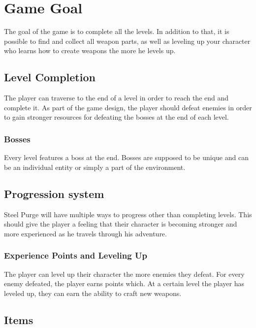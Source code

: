 \documentclass[../Main.tex]{subfiles}
\begin{document}
\section{Game Goal}

The goal of the game is to complete all the levels. In addition to that, it is possible to find and collect all weapon parts, as well as leveling up your character who learns how to create weapons the more he levels up. 

\subsection{Level Completion}

The player can traverse to the end of a level in order to reach the end and complete it. As part of the game design, the player should defeat enemies in order to gain stronger resources for defeating the bosses at the end of each level.

\subsubsection{Bosses}

Every level features a boss at the end. Bosses are supposed to be unique and can be an individual entity or simply a part of the environment.

\subsection{Progression system}

Steel Purge will have multiple ways to progress other than completing levels. This should give the player a feeling that their character is becoming stronger and more experienced as he travels through his adventure.

\subsubsection{Experience Points and Leveling Up}

The player can level up their character the more enemies they defeat. For every enemy defeated, the player earns points which. At a certain level the player has leveled up, they can earn the ability to craft new weapons.

\subsection{Items}
\end{document}
